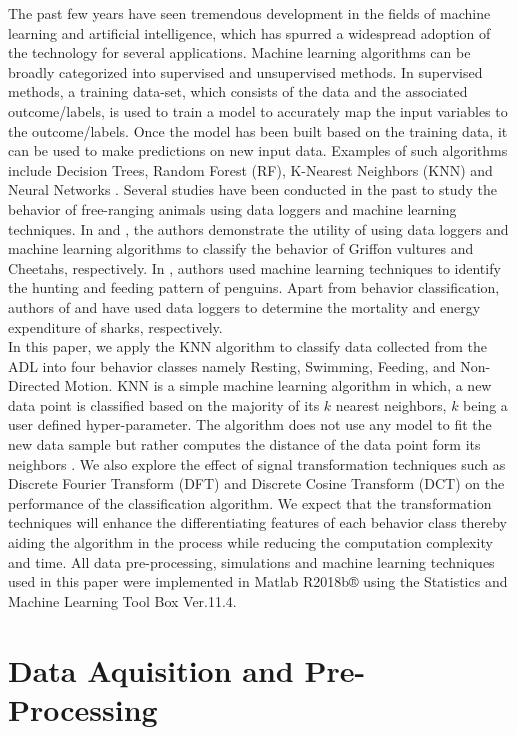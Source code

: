 \documentclass[conference]{IEEEtran}
\begin{document}
The past few years have seen tremendous development in the fields of machine learning and artificial intelligence, which has spurred a widespread adoption of the technology for several applications. Machine learning algorithms can be broadly categorized into supervised and unsupervised methods. In supervised methods, a training data-set, which consists of the data and the associated outcome/labels, is used to train a model to accurately map the input variables to the outcome/labels. Once the model has been built based on the training data, it can be used to make predictions on new input data. Examples of such algorithms include Decision Trees, Random Forest (RF), K-Nearest Neighbors (KNN) and Neural Networks \cite{brew}. 
Several studies have been conducted in the past to study the behavior of free-ranging animals using data loggers and machine learning techniques. In  \cite{nathan} and  \cite{gru}, the authors demonstrate the utility of using data loggers and machine learning algorithms to classify the behavior of Griffon vultures and Cheetahs, respectively. In  \cite{chess}, authors used machine learning techniques to identify the hunting and feeding pattern of penguins. Apart from behavior classification, authors of  \cite{whitney} and  \cite{gleiss} have used data loggers to determine the mortality and energy expenditure of sharks, respectively. \\
\indent In this paper, we apply the KNN algorithm to classify data collected from the ADL into four behavior classes namely Resting, Swimming, Feeding, and Non-Directed Motion. KNN is a simple machine learning algorithm in which, a new data point is classified based on the majority of its $k$ nearest neighbors, $k$ being a user defined hyper-parameter. The algorithm does not use any model to fit the new data sample but rather computes the distance of the data point form its neighbors  \cite{kag}. We also explore the effect of signal transformation techniques such as Discrete Fourier Transform (DFT) and Discrete Cosine Transform (DCT) on the performance of the classification algorithm. We expect that the transformation techniques will enhance the differentiating features of each behavior class thereby aiding the algorithm in the process while reducing the computation complexity and time. All data pre-processing, simulations and machine learning techniques used in this paper were implemented in Matlab R2018b® using the Statistics and Machine Learning Tool Box Ver.11.4.

\section{Data Aquisition and Pre-Processing}
\end{document}
